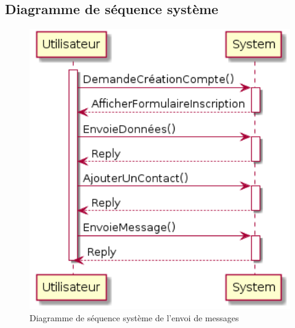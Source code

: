 \documentclass[a4paper,12pt]{article}
\begin{document}
	\subsection{Diagramme de séquence système}
	\begin{figure}[H]
		\centerline{\includegraphics[width=12.5cm]{../diagrammes/img/sequenceSystemeEnvoiMessage.png}}
		\caption{Diagramme de séquence système de l'envoi de messages}
	\end{figure}
\end{document}
